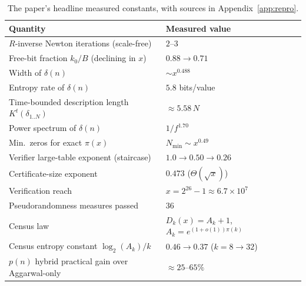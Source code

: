 \documentclass[11pt]{article}
\theoremstyle{plain}
\theoremstyle{definition}
\theoremstyle{remark}
\begin{document}
\begin{table}[h]
\centering
\footnotesize
\begin{tabular}{@{}p{8.4cm} l@{}}
\toprule
\textbf{Quantity} & \textbf{Measured value}\\
\midrule
$R$-inverse Newton iterations (scale-free) & $2$--$3$ \\
Free-bit fraction $k_0/B$ (declining in $x$) & $0.88\to0.71$ \\
Width of $\delta(n)$ & $\sim x^{0.488}$ \\
Entropy rate of $\delta(n)$ & $5.8$ bits/value \\
Time-bounded description length $K^t(\delta_{1..N})$ & ${\approx}5.58\,N$ \\
Power spectrum of $\delta(n)$ & $1/f^{1.70}$ \\
Min.\ zeros for exact $\pi(x)$ & $N_{\min}\sim x^{0.49}$ \\
Verifier large-table exponent (staircase) & $1.0\to0.50\to0.26$ \\
Certificate-size exponent & $0.473$ ($\Theta(\sqrt{x})$) \\
Verification reach & $x=2^{26}-1\approx6.7\times10^7$ \\
Pseudorandomness measures passed & $36$ \\
Census law & $D_k(x)=A_k+1$, $A_k=e^{(1+o(1))\pi(k)}$ \\
Census entropy constant $\log_2(A_k)/k$ & $0.46\to0.37$ ($k=8\to32$) \\
$p(n)$ hybrid practical gain over Aggarwal-only & ${\approx}25$--$65\%$ \\
\bottomrule
\end{tabular}
\caption{The paper's headline measured constants, with sources in
Appendix~\ref{app:repro}.}
\label{tab:constants}
\end{table}
\end{document}
